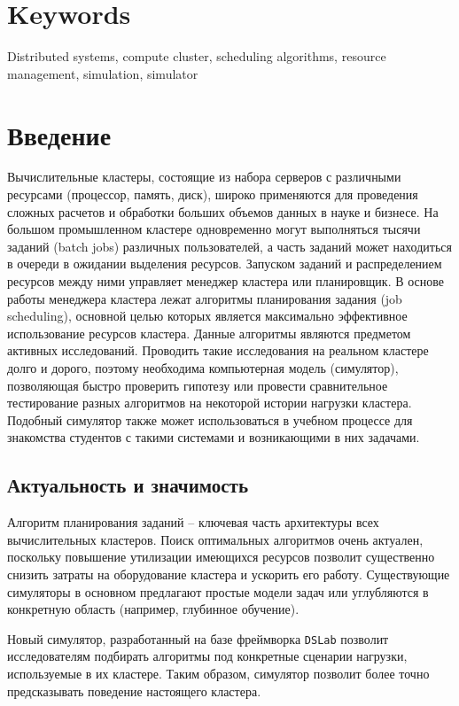 {%
\section*{Keywords}
Distributed systems, compute cluster, scheduling algorithms, resource management, simulation, simulator

}

\newpage 

\section{Введение}

Вычислительные кластеры, состоящие из набора серверов с различными ресурсами (процессор, память, диск), широко применяются для проведения сложных расчетов и обработки больших объемов данных в науке и бизнесе. На большом промышленном кластере одновременно могут выполняться тысячи заданий (batch jobs) различных пользователей, а часть заданий может находиться в очереди в ожидании выделения ресурсов. Запуском заданий и распределением ресурсов между ними управляет менеджер кластера или планировщик. В основе работы менеджера кластера лежат алгоритмы планирования задания (job scheduling), основной целью которых является максимально эффективное использование ресурсов кластера. Данные алгоритмы являются предметом активных исследований. Проводить такие исследования на реальном кластере долго и дорого, поэтому необходима компьютерная модель (симулятор), позволяющая быстро проверить гипотезу или провести сравнительное тестирование разных алгоритмов на некоторой истории нагрузки кластера. Подобный симулятор также может использоваться в учебном процессе для знакомства студентов с такими системами и возникающими в них задачами.

\subsection{Актуальность и значимость}

Алгоритм планирования заданий -- ключевая часть архитектуры всех вычислительных кластеров. Поиск оптимальных алгоритмов очень актуален, поскольку повышение утилизации имеющихся ресурсов позволит существенно снизить затраты на оборудование кластера и ускорить его работу. Существующие симуляторы в основном предлагают простые модели задач или углубляются в конкретную область (например, глубинное обучение). 

Новый симулятор, разработанный на базе фреймворка \texttt{DSLab} позволит исследователям подбирать алгоритмы под конкретные сценарии нагрузки, используемые в их кластере. Таким образом, симулятор позволит более точно предсказывать поведение настоящего кластера.  

